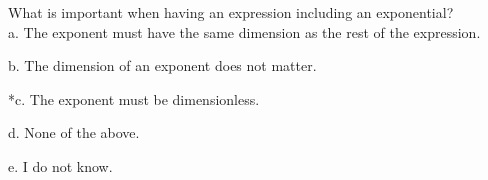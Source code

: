 
What is important when having an expression including an exponential?\\

a. The exponent must have the same dimension as the rest of the expression.

b. The dimension of an exponent does not matter.

*c. The exponent must be dimensionless.

d. None of the above.

e. I do not know.\\
